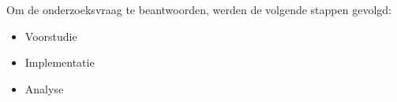 
\chapter{}%
\label{ch:methodologie}


Om de onderzoeksvraag te beantwoorden, werden de volgende stappen gevolgd:

\begin{itemize}
  \item Voorstudie
  \item Implementatie
  \item Analyse
\end{itemize} 

